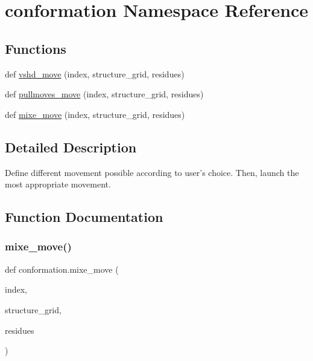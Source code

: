 \hypertarget{namespaceconformation}{}\section{conformation Namespace Reference}
\label{namespaceconformation}
\subsection*{Functions}
\begin{DoxyCompactItemize}
\item 
def \hyperlink{namespaceconformation_a68e0c087ab604cbc37a7fe9a27622d8c}{vshd\+\_\+move} (index, structure\+\_\+grid, residues)
\item 
def \hyperlink{namespaceconformation_a46040be6196d233d4eeea6dec428bce3}{pullmoves\+\_\+move} (index, structure\+\_\+grid, residues)
\item 
def \hyperlink{namespaceconformation_a06c4d9418eba30a2ab35ffa82731451f}{mixe\+\_\+move} (index, structure\+\_\+grid, residues)
\end{DoxyCompactItemize}


\subsection{Detailed Description}
\begin{DoxyVerb}    Define different movement possible according to user's choice.
    Then, launch the most appropriate movement.
\end{DoxyVerb}
 

\subsection{Function Documentation}
\mbox{\label{namespaceconformation_a06c4d9418eba30a2ab35ffa82731451f}} 
\subsubsection{\texorpdfstring{mixe\+\_\+move()}{mixe\_move()}}
{\footnotesize\ttfamily def conformation.\+mixe\+\_\+move (\begin{DoxyParamCaption}\item[{}]{index,  }\item[{}]{structure\+\_\+grid,  }\item[{}]{residues }\end{DoxyParamCaption})}

